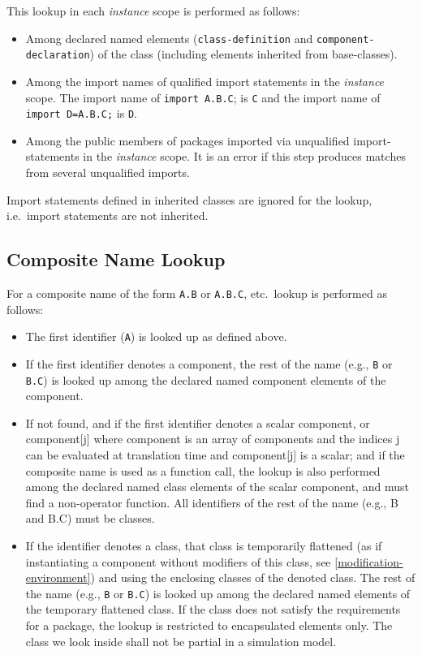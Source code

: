 This lookup in each \emph{instance} scope is performed as follows:
\begin{itemize}
\item
  Among declared named elements (\lstinline!class-definition! and
  \lstinline!component-declaration!) of the class (including elements inherited from
  base-classes).
\item
  Among the import names of qualified import statements in the
  \emph{instance} scope. The import name of \lstinline!import A.B.C!; is \lstinline!C! and the
  import name of \lstinline!import D=A.B.C;! is \lstinline!D!.
\item
  Among the public members of packages imported via unqualified
  import-statements in the \emph{instance} scope. It is an error if
  this step produces matches from several unqualified imports.
\end{itemize}

Import statements defined in inherited classes are ignored for the lookup, i.e.\ import statements are not inherited.

\subsection{Composite Name Lookup}\label{composite-name-lookup}

For a composite name of the form \lstinline!A.B! or \lstinline!A.B.C!, etc.\ lookup is performed as follows:
\begin{itemize}
\item
  The first identifier (\lstinline!A!) is looked up as defined above.
\item
  If the first identifier denotes a component, the rest of the name
  (e.g., \lstinline!B! or \lstinline!B.C!) is looked up among the declared named component
  elements of the component.
\item
  If not found, and if the first identifier denotes a scalar component,
  or component[j] where component is an array of components and the
  indices j can be evaluated at translation time and component[j] is
  a scalar; and if the composite name is used as a function call, the
  lookup is also performed among the declared named class elements of
  the scalar component, and must find a non-operator function. All
  identifiers of the rest of the name (e.g., B and B.C) must be
  classes.
\item
  If the identifier denotes a class, that class is temporarily flattened
  (as if instantiating a component without modifiers of this class, see
  \cref{modification-environment}) and using the enclosing classes of the denoted class.
  The rest of the name (e.g., \lstinline!B! or \lstinline!B.C!) is looked up among the
  declared named elements of the temporary flattened class. If the class
  does not satisfy the requirements for a package, the lookup is
  restricted to encapsulated elements only. The class we look inside shall
  not be partial in a simulation model.
\end{itemize}

